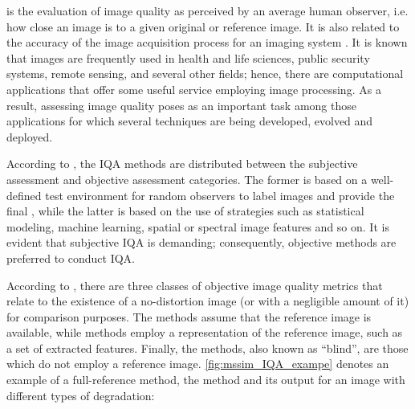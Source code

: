  is the evaluation of image quality as perceived by an average human observer, i.e. how close an image is to a given original or reference image. It is also related to the accuracy of the image acquisition process for an imaging system \cite{bovik2009essential}. It is known that images are frequently used in health and life sciences, public security systems, remote sensing, and several other fields; hence, there are computational applications that offer some useful service employing image processing. As a result, assessing image quality poses as an important task among those applications for which several techniques are being developed, evolved and deployed.

According to , the IQA methods are distributed between the subjective assessment and objective assessment categories. The former is based on a well-defined test environment for random observers to label images and provide the final , while the latter is based on the use of strategies such as statistical modeling, machine learning, spatial or spectral image features and so on. It is evident that subjective IQA is demanding; consequently, objective methods are preferred to conduct IQA.

According to , there are three classes of objective image quality metrics that relate to the existence of a no-distortion image (or with a negligible amount of it) for comparison purposes. The  methods assume that the reference image is available, while  methods employ a representation of the reference image, such as a set of extracted features. Finally, the  methods, also known as ``blind'', are those which do not employ a reference image. \autoref{fig:mssim_IQA_exampe} denotes an example of a full-reference method, the  method and its output for an image with different types of degradation:

